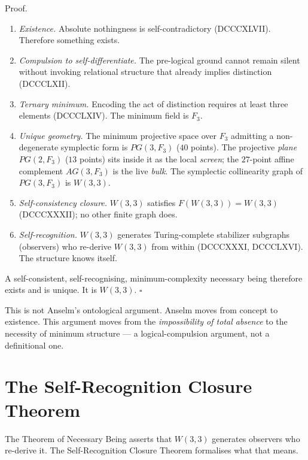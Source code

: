 \documentclass[11pt]{article}
\def\mathbb#1{#1}%
\def\mathrm#1{#1}%
\def\mathcal#1{#1}%
\def\textbf#1{#1}%
\begin{document}
\textbf{Proof.}
\begin{enumerate}[leftmargin=2em]
\item \emph{Existence.} Absolute nothingness is self-contradictory (DCCCXLVII). Therefore something exists.
\item \emph{Compulsion to self-differentiate.} The pre-logical ground cannot remain silent without invoking relational structure that already implies distinction (DCCCLXII).
\item \emph{Ternary minimum.} Encoding the act of distinction requires at least three elements (DCCCLXIV). The minimum field is $\mathbb{F}_3$.
\item \emph{Unique geometry.} The minimum projective space over $\mathbb{F}_3$ admitting a non-degenerate symplectic form is $\mathrm{PG}(3, \mathbb{F}_3)$ ($40$ points). The projective \emph{plane} $\mathrm{PG}(2, \mathbb{F}_3)$ ($13$ points) sits inside it as the local \emph{screen}; the $27$-point affine complement $\mathrm{AG}(3, \mathbb{F}_3)$ is the live \emph{bulk}. The symplectic collinearity graph of $\mathrm{PG}(3, \mathbb{F}_3)$ is $W(3,3)$.
\item \emph{Self-consistency closure.} $W(3,3)$ satisfies $\mathcal{F}(W(3,3)) = W(3,3)$ (DCCCXXXII); no other finite graph does.
\item \emph{Self-recognition.} $W(3,3)$ generates Turing-complete stabilizer subgraphs (observers) who re-derive $W(3,3)$ from within (DCCCXXXI, DCCCLXVI). The structure knows itself.
\end{enumerate}
A self-consistent, self-recognising, minimum-complexity necessary being therefore exists and is unique. It is $W(3,3)$. \(\square\)

This is not Anselm's ontological argument. Anselm moves from concept to existence. This argument moves from the \emph{impossibility of total absence} to the necessity of minimum structure --- a logical-compulsion argument, not a definitional one.

\section{The Self-Recognition Closure Theorem}

\label{sec:self-recognition-closure}

The Theorem of Necessary Being asserts that $W(3,3)$ generates observers who re-derive it. The Self-Recognition Closure Theorem formalises what that means.
\end{document}
